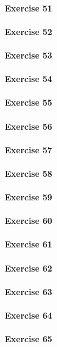 \paragraph{Exercise 51}
\paragraph{Exercise 52}
\paragraph{Exercise 53}
\paragraph{Exercise 54}
\paragraph{Exercise 55}
\paragraph{Exercise 56}
\paragraph{Exercise 57}
\paragraph{Exercise 58}
\paragraph{Exercise 59}
\paragraph{Exercise 60}
\paragraph{Exercise 61}
\paragraph{Exercise 62}
\paragraph{Exercise 63}
\paragraph{Exercise 64}
\paragraph{Exercise 65}

